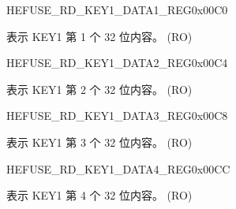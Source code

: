 \begin{register}{H}{EFUSE\_RD\_KEY1\_DATA1\_REG}{0x00C0}\label{regdesc:EFUSERDKEY1DATA1REG}
%
\regnewline%
\begin{regdesc}\begin{reglist}
\label{fielddesc:EFUSEKEY1DATA1}\item [EFUSE\_KEY1\_DATA1] 表示 KEY1 第 1 个 32 位内容。 (RO)
\end{reglist}\end{regdesc}
\end{register}


\begin{register}{H}{EFUSE\_RD\_KEY1\_DATA2\_REG}{0x00C4}\label{regdesc:EFUSERDKEY1DATA2REG}
%
\regnewline%
\begin{regdesc}\begin{reglist}
\label{fielddesc:EFUSEKEY1DATA2}\item [EFUSE\_KEY1\_DATA2] 表示 KEY1 第 2 个 32 位内容。 (RO)
\end{reglist}\end{regdesc}
\end{register}


\begin{register}{H}{EFUSE\_RD\_KEY1\_DATA3\_REG}{0x00C8}\label{regdesc:EFUSERDKEY1DATA3REG}
%
\regnewline%
\begin{regdesc}\begin{reglist}
\label{fielddesc:EFUSEKEY1DATA3}\item [EFUSE\_KEY1\_DATA3] 表示 KEY1 第 3 个 32 位内容。 (RO)
\end{reglist}\end{regdesc}
\end{register}


\begin{register}{H}{EFUSE\_RD\_KEY1\_DATA4\_REG}{0x00CC}\label{regdesc:EFUSERDKEY1DATA4REG}
%
\regnewline%
\begin{regdesc}\begin{reglist}
\label{fielddesc:EFUSEKEY1DATA4}\item [EFUSE\_KEY1\_DATA4] 表示 KEY1 第 4 个 32 位内容。 (RO)
\end{reglist}\end{regdesc}
\end{register}


